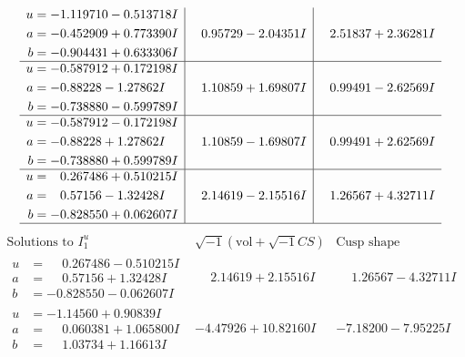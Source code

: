 \documentclass[1p]{elsarticle_modified}
\theoremstyle{definition}
\newcommand{\I}{\sqrt{-1}}
\begin{document}
$$\begin{array}{c|c|c}
\begin{aligned}
u &= -1.119710 - 0.513718 I \\
a &= -0.452909 + 0.773390 I \\
b &= -0.904431 + 0.633306 I\end{aligned}
 & \phantom{-}0.95729 - 2.04351 I & \phantom{-}2.51837 + 2.36281 I \\ \hline\begin{aligned}
u &= -0.587912 + 0.172198 I \\
a &= -0.88228 - 1.27862 I \\
b &= -0.738880 - 0.599789 I\end{aligned}
 & \phantom{-}1.10859 + 1.69807 I & \phantom{-}0.99491 - 2.62569 I \\ \hline\begin{aligned}
u &= -0.587912 - 0.172198 I \\
a &= -0.88228 + 1.27862 I \\
b &= -0.738880 + 0.599789 I\end{aligned}
 & \phantom{-}1.10859 - 1.69807 I & \phantom{-}0.99491 + 2.62569 I \\ \hline\begin{aligned}
u &= \phantom{-}0.267486 + 0.510215 I \\
a &= \phantom{-}0.57156 - 1.32428 I \\
b &= -0.828550 + 0.062607 I\end{aligned}
 & \phantom{-}2.14619 - 2.15516 I & \phantom{-}1.26567 + 4.32711 I\\
 \hline 
 \end{array}$$\newpage$$\begin{array}{c|c|c}  
\text{Solutions to }I^u_{1}& \I (\text{vol} + \sqrt{-1}CS) & \text{Cusp shape}\\
 \hline 
\begin{aligned}
u &= \phantom{-}0.267486 - 0.510215 I \\
a &= \phantom{-}0.57156 + 1.32428 I \\
b &= -0.828550 - 0.062607 I\end{aligned}
 & \phantom{-}2.14619 + 2.15516 I & \phantom{-}1.26567 - 4.32711 I \\ \hline\begin{aligned}
u &= -1.14560 + 0.90839 I \\
a &= \phantom{-}0.060381 + 1.065800 I \\
b &= \phantom{-}1.03734 + 1.16613 I\end{aligned}
 & -4.47926 + 10.82160 I & -7.18200 - 7.95225 I \\ \hline\begin{aligned}

\end{aligned}
\end{array}$$
\end{document}
